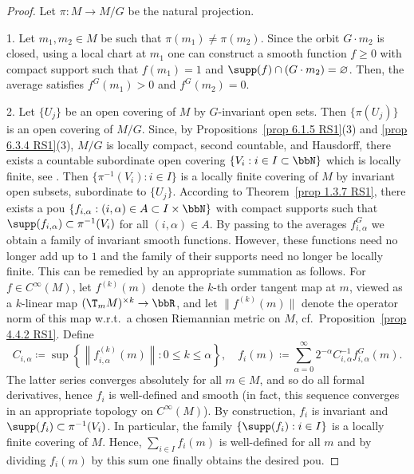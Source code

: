 \begin{proof}
    Let $\pi: M\to M\slash G$ be the natural projection.

    1. Let $m_1,m_2\in M$ be such that $\pi(m_1)\neq \pi(m_2)$. Since the orbit $G\cdot m_2$ is closed, using a local chart at $m_1$ one can construct a smooth function $f\geq 0$ with compact support such that $f(m_1)=1$ and $\supp(f)\cap (G\cdot m_2)=\varnothing$. Then, the average satisfies $f^G(m_1)>0$ and $f^G(m_2)=0$.

    2. Let $\{U_j\}$ be an open covering of $M$ by $G$-invariant open sets. Then $\{\pi(U_j)\}$ is an open covering of $M\slash G$. Since, by Propositions~\ref{prop 6.1.5 RS1}(3) and \ref{prop 6.3.4 RS1}(3), $M\slash G$ is locally compact, second countable, and Hausdorff, there exists a countable subordinate open covering $\{V_i:i\in I\subset \bbN\}$ which is locally finite, see \cite[Lem.~1.9]{Warner}. Then $\{\pi^{-1}(V_i):i\in I\}$ is a locally finite covering of $M$ by invariant open subsets, subordinate to $\{U_j\}$. According to Theorem~\ref{prop 1.3.7 RS1}, there exists a \gls{pou} $\{f_{i,\alpha}:(i,\alpha)\in A\subset I\times\bbN\}$ with compact supports such that $\supp(f_{i,\alpha})\subset \pi^{-1}(V_i)$ for all $(i,\alpha)\in A$. By passing to the averages $f_{i,\alpha}^G$ we obtain a family of invariant smooth functions. However, these functions need no longer add up to $1$ and the family of their supports need no longer be locally finite. This can be remedied by an appropriate summation as follows. For $f\in C^\infty(M)$, let $f^{(k)}(m)$ denote the $k$-th order tangent map at $m$, viewed as a $k$-linear map $(\T_m M)^{\times k}\to \bbR$, and let $\lVert f^{(k)}(m)\rVert$ denote the operator norm of this map w.r.t.\ a chosen Riemannian metric on $M$, cf.\ Proposition~\ref{prop 4.4.2 RS1}. Define 
    \[C_{i,\alpha}\coloneqq \sup\left\{\left\lVert f_{i,\alpha}^{(k)}(m)\right\rVert:0\leq k\leq \alpha\right\},\quad f_i(m)\coloneqq \sum_{\alpha=0}^\infty 2^{-\alpha}C_{i,\alpha}^{-1}f_{i,\alpha}^G(m).\]
    The latter series converges absolutely for all $m\in M$, and so do all formal derivatives, hence $f_i$ is well-defined and smooth (in fact, this sequence converges in an appropriate topology on $C^\infty(M)$). By construction, $f_i$ is invariant and $\supp(f_i)\subset\pi^{-1}(V_i)$. In particular, the family $\{\supp(f_i):i\in I\}$ is a locally finite covering of $M$. Hence, $\sum_{i\in I}f_i(m)$ is well-defined for all $m$ and by dividing $f_i(m)$ by this sum one finally obtains the desired \gls{pou}.


\end{proof}
